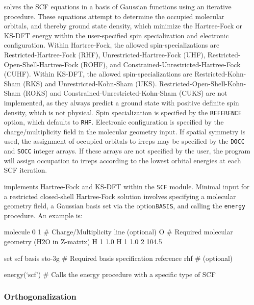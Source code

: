 \PSIfour solves the SCF equations in a basis of Gaussian functions using an
iterative procedure. These equations attempt to determine the occupied molecular
orbitals, and thereby ground state density, which minimize the Hartree-Fock or
KS-DFT energy within the user-specified spin specialization and electronic
configuration. Within Hartree-Fock, the allowed spin-specializations are
Restricted-Hartree-Fock (RHF), Unrestricted-Hartree-Fock (UHF),
Restricted-Open-Shell-Hartree-Fock (ROHF), and
Constrained-Unrestricted-Hartree-Fock (CUHF). Within KS-DFT, the allowed
spin-specializations are Restricted-Kohn-Sham (RKS) and Unrestricted-Kohn-Sham
(UKS). Restricted-Open-Shell-Kohn-Sham (ROKS) and
Constrained-Unrestricted-Kohn-Sham (CUKS) are not implemented, as they always
predict a ground state with positive definite spin density, which is not
physical. Spin specialization is specified by the \texttt{REFERENCE} option,
which defaults to \texttt{RHF}.  Electronic configuration is specified by the
charge/multiplicity field in the molecular geometry input. 
If spatial
symmetry is used, the assignment of occupied orbitals to irreps may be specified
by the \texttt{DOCC} and \texttt{SOCC} integer arrays. If these arrays are not
specified by the user, the program will assign occupation to irreps according to
the lowest orbital energies at each SCF iteration.  

\PSIfour implements Hartree-Fock and KS-DFT within the \texttt{SCF} module.
Minimal input for a restricted closed-shell Hartree-Fock solution involves
specifying a molecular geometry field, a Gaussian basis set via the
option\texttt{BASIS}, and calling the \texttt{energy} procedure. An example is:
\begin{Snippet}
molecule {
0 1              # Charge/Multiplicity line (optional)
O                # Required molecular geometry (H2O in Z-matrix)
H 1 1.0
H 1 1.0 2 104.5
}

set scf {        
basis sto-3g     # Required basis specification
reference rhf    # (optional)
}

energy(`scf')    # Calls the energy procedure with a specific type of SCF
\end{Snippet}

\subsubsection{Orthogonalization}

